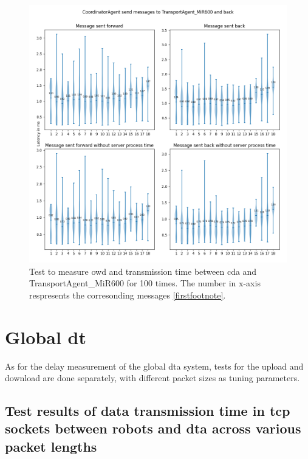 \begin{figure}[htb]
    \centering
    \includegraphics[width=\textwidth]{figures/tests/usecase/violin_CoordinatorAgent_to_TransportAgent_MiR600.png}\hfill 
    \caption{Test to measure \gls{owd} and transmission time between \gls{cda} and 
    TransportAgent\_MiR600 for 100 times. The number in x-axis respresents the 
    corresonding messages \protect\ref{firstfootnote}.}
    \label{fig: violin-CDA-T600}
\end{figure}




\section{Global \gls{dt}}\label{chap: Result-External}
As for the delay measurement of the global \gls{dta} system, tests for the 
upload and download are done separately, with different packet sizes as tuning 
parameters. 


\subsection{Test results of data transmission 
time in \gls{tcp} sockets between robots and \gls{dta} across 
various packet lengths} \label{chap: Result-RCP-DTA}

